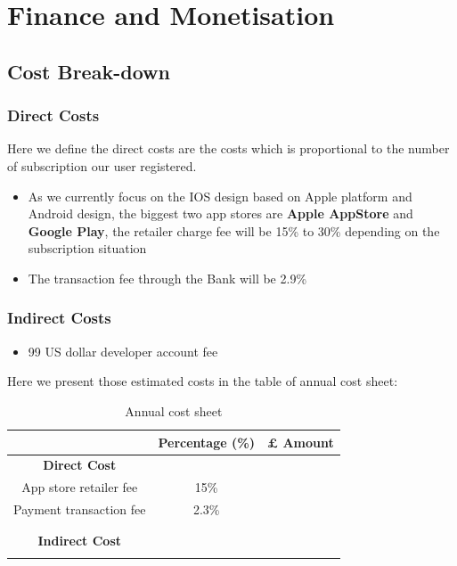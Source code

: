 \section{Finance and Monetisation}

\subsection{Cost Break-down}
\subsubsection{Direct Costs}
Here we define the direct costs are the costs which is proportional to the number of subscription our user registered.

\begin{itemize}
\item As we currently focus on the IOS design based on Apple platform and Android design, the biggest two app stores are \textbf{Apple AppStore} and \textbf{Google Play}, the retailer charge fee will be 15\% to 30\% depending on the subscription situation
\item The transaction fee through the Bank will be 2.9\%
\end{itemize}


\subsubsection{Indirect Costs}
\begin{itemize}
\item 99 US dollar developer account fee 
\end{itemize}

Here we present those estimated costs in the table of annual cost sheet:

\begin{table}[ht]
\centering
\begin{tabular}{ |c|c|c|} 
 \hline
 &\textbf{Percentage (\%)} &\textbf{ £ Amount }\\
 \hline
\multicolumn{1}{|c}{\textbf{Direct Cost}} &\multicolumn{1}{c}{}&\\
 \hline
 App store retailer fee&15\%&\\
 \hline
 Payment transaction fee&2.3\%&\\
 \hline
 &&\\
 \hline
 \multicolumn{1}{|c}{}&\multicolumn{1}{c}{}&\\
 \multicolumn{1}{|c}{\textbf{Indirect Cost}} &\multicolumn{1}{c}{}&\\
 \hline
 &&\\
 \hline
 \end{tabular}
 \caption{Annual cost sheet}
 \centering
 \end{table}

